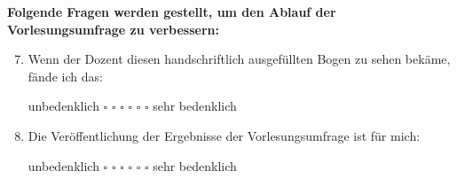 \documentclass[10pt,a4paper]{article}
\begin{document}
\textbf{Folgende Fragen werden gestellt, um den Ablauf der Vorlesungsumfrage zu verbessern:}
	\begin{enumerate}
		\setcounter{enumi}{6}
		\item Wenn der Dozent diesen handschriftlich ausgefüllten Bogen zu sehen bekäme, fände ich das:
		\vspace{-1pt}
		\begin{center}
			unbedenklich \hspace{0.2cm} $\square$ \hspace{1cm} $\square$ \hspace{1cm} $\square$ \hspace{1cm} $\square$ \hspace{1cm} $\square$ \hspace{1cm} $\square$ \hspace{0.2cm} sehr bedenklich
		\end{center}

		\item Die Veröffentlichung der Ergebnisse der Vorlesungsumfrage ist für mich:
		\vspace{-1pt}
		\begin{center}
			unbedenklich \hspace{0.2cm} $\square$ \hspace{1cm} $\square$ \hspace{1cm} $\square$ \hspace{1cm} $\square$ \hspace{1cm} $\square$ \hspace{1cm} $\square$ \hspace{0.2cm} sehr bedenklich
		\end{center}

	\end{enumerate}
\end{document}
